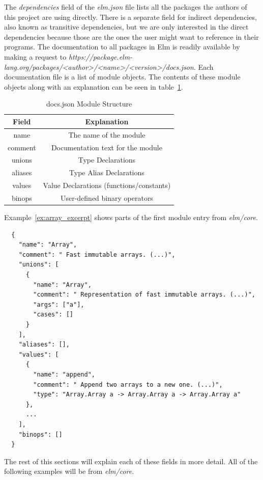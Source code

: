 \documentclass[../thesis.tex]{subfiles}
\begin{document}
The \textit{dependencies} field of the \textit{elm.json} file lists all the packages the authors of this project
are using directly.
There is a separate field for indirect dependencies, also known as transitive dependencies, 
but we are only interested in the direct dependencies because those are the ones the user might want to
reference in their programs.
The documentation to all packages in Elm is readily available by making a request to
\textit{https://package.elm-lang.org/packages/<author>/<name>/<version>/docs.json}.
Each documentation file is a list of module objects.
The contents of these module objects along with an explanation can be seen in table~\ref{tab:documentation_fields}.

\begin{table}[htpb]
    \centering
    \label{tab:documentation_fields}
    \begin{tabular}{|c|c|}
        \hline
        Field & Explanation \\
        \hline
        name & The name of the module \\
        comment & Documentation text for the module \\
        unions & Type Declarations \\
        aliases & Type Alias Declarations \\
        values & Value Declarations (functions/constants) \\
        binops & User-defined binary operators \\
        \hline
    \end{tabular}
    \caption{docs.json Module Structure}
\end{table}


Example~\ref{ex:array_excerpt} shows parts of the first module entry from \textit{elm/core}.
\begin{example}\label{ex:array_excerpt}
\begin{verbatim}
  {
    "name": "Array",
    "comment": " Fast immutable arrays. (...)",
    "unions": [
      {
        "name": "Array",
        "comment": " Representation of fast immutable arrays. (...)",
        "args": ["a"],
        "cases": []
      }
    ],
    "aliases": [],
    "values": [
      {
        "name": "append",
        "comment": " Append two arrays to a new one. (...)",
        "type": "Array.Array a -> Array.Array a -> Array.Array a"
      },
      ...
    ],
    "binops": []
  }
\end{verbatim}
\end{example}
The rest of this sections will explain each of these fields in more detail.
All of the following examples will be from \textit{elm/core}.
\end{document}
